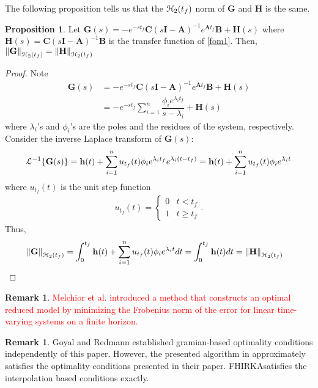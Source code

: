 \documentclass[preprint]{elsarticle}
\theoremstyle{definition}
\newtheorem{remark}[theorem]{Remark}
\theoremstyle{definition}
\def\mathcal{\EuScript}
\numberwithin{equation}{section}
\newtheorem{Proposition}[Theorem]{Proposition}
\newcommand{\FH}{FHIRKA}
\newcommand{\A}{\mathbf{A}}
\newcommand{\B}{\mathbf{B}}
\newcommand{\I}{\mathbf{I}}
\newcommand{\G}{\mathbf{G}}
\newcommand{\C}{\mathbf{C}}
\newcommand{\HH}{\mathbf{H}}
\newcommand{\h}{\mathbf{h}}
\newcommand{\tf}{t_f}
\newcommand{\ch}{\mathcal{H}}
\newcommand{\norm}[1]{\left\lVert#1\right\rVert}
\begin{document}
The following proposition tells us that the $\ch_2(\tf)$ norm of $\G$ and $\HH$ is the same. %
\begin{Proposition}
Let  $\G(s)=-e^{-s{\tf}}\C(s\I-\A)^{-1}e^{\A {\tf}}\B+\HH(s)$ where $\HH(s)=\C(s\I-\A)^{-1}\B$  is the transfer function of \eqref{fom1}. Then, $\norm{\G}_{\ch_2({\tf})}=\norm{\HH}_{\ch_2({\tf})}$
\end{Proposition}
\begin{proof}
Note 
\begin{align*}
\G(s)&=-e^{-s{\tf}}\C(s\I-\A)^{-1}e^{\A {\tf}}\B+\HH(s)\\
&=-e^{-s{\tf}}\sum_{i=1}^n \dfrac{\phi_i e^{\lambda_i {\tf}}}{s-\lambda_i}+\HH(s)
\end{align*}
where $\lambda_i$'s and $\phi_i$'s are the poles and the residues of the system, respectively. 
Consider the inverse Laplace transform of $\G(s)$:
\begin{align*}
\mathcal{L}^{-1}\{\G(s)\}=\h(t)+\sum_{i=1}^n u_{\tf}(t)\phi_i e^{\lambda_i {\tf}}e^{\lambda_i (t-{\tf})}=\h(t)+\sum_{i=1}^n u_{\tf}(t)\phi_i e^{\lambda_i t}
\end{align*}
where $u_{\tf}(t)$ is the unit step function
\begin{align*}
u_{\tf}(t)=
 \begin{cases} 
      0 &    t< {\tf} \\    
      1 &    t\geq {\tf} 
   \end{cases}.
\end{align*}
Thus, 
\begin{align*}
\norm{\G}_{\ch_2({\tf})}&=\int_0^{\tf}\h(t)+\sum_{i=1}^n u_{\tf}(t)\phi_i e^{\lambda_i t} dt=\int_0^{\tf}\h(t)dt=\norm{\HH}_{\ch_2({\tf})}
\end{align*}
\end{proof}


\begin{remark}
\textcolor{red}{Melchior et al. introduced a method that constructs an optimal reduced model by minimizing the Frobenius norm of the error for linear time-varying systems on a finite horizon\cite{MelVG14}.}
\end{remark}

\begin{remark} Goyal and Redmann established gramian-based optimality conditions independently of this paper. However, the presented algorithm in \cite{GoyR17} approximately satisfies the optimality conditions presented in their paper.  \FH satisfies the interpolation based conditions exactly. 
\end{remark}
\end{document}
